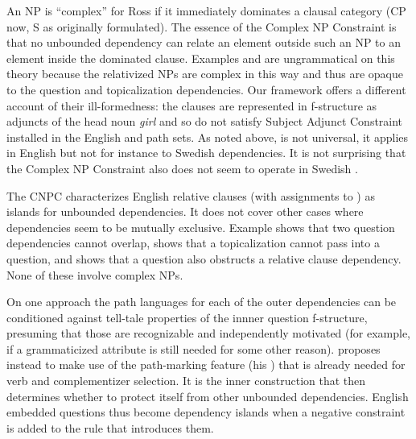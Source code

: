 \documentclass[output=paper,hidelinks]{langscibook}
\begin{document}
An NP is ``complex'' for Ross if it immediately dominates a clausal category (CP now, S as originally formulated). The  essence of the Complex NP Constraint is that no unbounded dependency can relate an element outside such an NP to an element inside the dominated clause.  Examples  and  are ungrammatical on this theory because the relativized NPs are complex in this way and thus are opaque to the question and topicalization dependencies.  Our framework offers a different account of their ill-formedness: the clauses are represented in f-structure as adjuncts of the head noun \textit{girl} and so do not satisfy Subject Adjunct Constraint installed in the English  and  path sets.  As noted above,  is not universal, it applies in English but not for instance to Swedish dependencies.   It is not surprising that the Complex NP Constraint also does not seem to operate in Swedish \citep{Muller19}.

The CNPC characterizes English relative clauses (with assignments to \ADJ) as islands for unbounded dependencies. It does not cover other cases where dependencies seem to be mutually exclusive.  Example   shows that two question dependencies cannot overlap,  shows that a topicalization cannot pass into a question, and  shows that a question also obstructs a relative clause dependency. None of these involve complex NPs.

\ea\label{cncq}
\label{firstq}
\label{q2}
\label{q3}
\label{lastq}
\z\z

\noindent On one approach the path languages for each of the outer dependencies can be conditioned against tell-tale properties of the innner question f-structure, presuming that those are recognizable and independently motivated (for example, if a grammaticized \FOCUS attribute is still needed for some other reason).  \citet{falk09} proposes instead to make use of the path-marking feature  (his ) that is already needed for verb and complementizer selection.  It is the inner construction that then determines whether to protect itself from other unbounded dependencies. English embedded questions thus become dependency islands when a negative  constraint is added to the rule  that introduces them.
\end{document}
